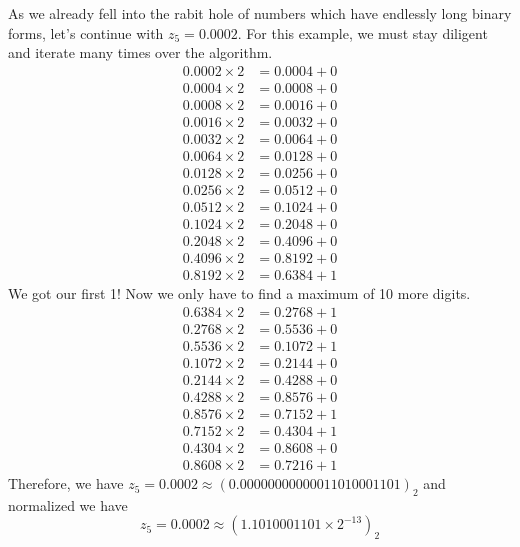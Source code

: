 %
%
\begin{exmp}
    As we already fell into the rabit hole of numbers which have endlessly long binary forms, let's continue with \(z_5 = 0.0002\). For this example, we must stay diligent and iterate many times over the algorithm.
    \begin{align*}
        0.0002 \times 2 &= 0.0004 + 0 \\
        0.0004 \times 2 &= 0.0008 + 0 \\
        0.0008 \times 2 &= 0.0016 + 0 \\
        0.0016 \times 2 &= 0.0032 + 0 \\
        0.0032 \times 2 &= 0.0064 + 0 \\
        0.0064 \times 2 &= 0.0128 + 0 \\
        0.0128 \times 2 &= 0.0256 + 0 \\
        0.0256 \times 2 &= 0.0512 + 0 \\
        0.0512 \times 2 &= 0.1024 + 0 \\
        0.1024 \times 2 &= 0.2048 + 0 \\
        0.2048 \times 2 &= 0.4096 + 0 \\
        0.4096 \times 2 &= 0.8192 + 0 \\
        0.8192 \times 2 &= 0.6384 + 1
    \end{align*}
    We got our first 1! Now we only have to find a maximum of 10 more digits.
    \begin{align*}
        0.6384 \times 2 &= 0.2768 + 1 \\
        0.2768 \times 2 &= 0.5536 + 0 \\
        0.5536 \times 2 &= 0.1072 + 1 \\
        0.1072 \times 2 &= 0.2144 + 0 \\
        0.2144 \times 2 &= 0.4288 + 0 \\
        0.4288 \times 2 &= 0.8576 + 0 \\
        0.8576 \times 2 &= 0.7152 + 1 \\
        0.7152 \times 2 &= 0.4304 + 1 \\
        0.4304 \times 2 &= 0.8608 + 0 \\
        0.8608 \times 2 &= 0.7216 + 1
    \end{align*}
    Therefore, we have \(z_5 = 0.0002 \approx (0.00000000000011010001101)_2\) and normalized we have
    \begin{equation*}
        z_5 = 0.0002 \approx (1.1010001101 \times 2^{-13})_2
    \end{equation*}
\end{exmp}
